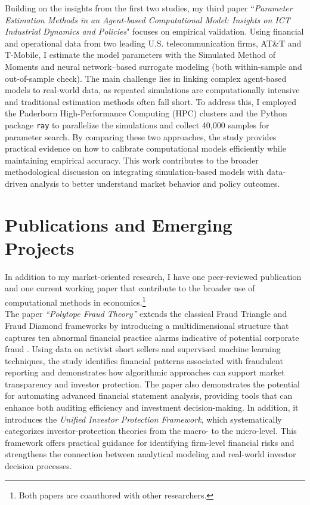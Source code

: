 \documentclass{nfr}
\begin{document}
Building on the insights from the first two studies, my third paper ``\textit{Parameter Estimation Methods in an Agent-based Computational Model: Insights on ICT Industrial Dynamics and Policies}" focuses on empirical validation. 
Using financial and operational data from two leading U.S. telecommunication firms, AT\&T and T-Mobile, I estimate the model parameters with the Simulated Method of Moments and neural network–based surrogate modeling (both within-sample and out-of-sample check). 
The main challenge lies in linking complex agent-based models to real-world data, as repeated simulations are computationally intensive and traditional estimation methods often fall short. 
To address this, I employed the Paderborn High-Performance Computing (HPC) clusters and the Python package \texttt{ray} to parallelize the simulations and collect 40{,}000 samples for parameter search. 
By comparing these two approaches, the study provides practical evidence on how to calibrate computational models efficiently while maintaining empirical accuracy. This work contributes to the broader methodological discussion on integrating simulation-based models with data-driven analysis to better understand market behavior and policy outcomes.



\section*{Publications and Emerging Projects}

In addition to my market-oriented research, I have one peer-reviewed publication and one current working paper that contribute to the broader use of computational methods in economics.\footnote{Both papers are coauthored with other researchers.} \\

The paper \textit{``Polytope Fraud Theory''} extends the classical Fraud Triangle and Fraud Diamond frameworks by introducing a multidimensional structure that captures ten abnormal financial practice alarms indicative of potential corporate fraud \citep{Zhao2025}. Using data on activist short sellers and supervised machine learning techniques, the study identifies financial patterns associated with fraudulent reporting and demonstrates how algorithmic approaches can support market transparency and investor protection. 
The paper also demonstrates the potential for automating advanced financial statement analysis, providing tools that can enhance both auditing efficiency and investment decision-making. In addition, it introduces the \textit{Unified Investor Protection Framework}, which systematically categorizes investor-protection theories from the macro- to the micro-level. This framework offers practical guidance for identifying firm-level financial risks and strengthens the connection between analytical modeling and real-world investor decision processes.\\
\end{document}
